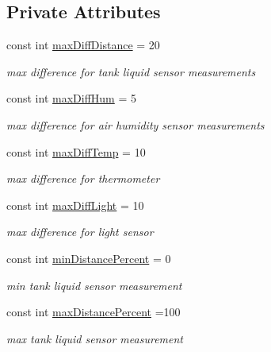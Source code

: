 \subsection*{Private Attributes}
\begin{DoxyCompactItemize}
\item 
\mbox{\label{class_tests_a1f46ebabda9d5d8167e3a4d223457a15}} 
const int \hyperlink{class_tests_a1f46ebabda9d5d8167e3a4d223457a15}{max\+Diff\+Distance} = 20
\begin{DoxyCompactList}\small\item\em max difference for tank liquid sensor measurements \end{DoxyCompactList}\item 
\mbox{\label{class_tests_a07ab513e49457d7d2af195f406cd72c4}} 
const int \hyperlink{class_tests_a07ab513e49457d7d2af195f406cd72c4}{max\+Diff\+Hum} = 5
\begin{DoxyCompactList}\small\item\em max difference for air humidity sensor measurements \end{DoxyCompactList}\item 
\mbox{\label{class_tests_a525378ce61a185d6d07c2afd4b188508}} 
const int \hyperlink{class_tests_a525378ce61a185d6d07c2afd4b188508}{max\+Diff\+Temp} = 10
\begin{DoxyCompactList}\small\item\em max difference for thermometer \end{DoxyCompactList}\item 
\mbox{\label{class_tests_a028492ea95d4af61e0ea356b8fbdb5a0}} 
const int \hyperlink{class_tests_a028492ea95d4af61e0ea356b8fbdb5a0}{max\+Diff\+Light} = 10
\begin{DoxyCompactList}\small\item\em max difference for light sensor \end{DoxyCompactList}\item 
\mbox{\label{class_tests_aeff6ef71e5954e016fc76b9c3d3b6642}} 
const int \hyperlink{class_tests_aeff6ef71e5954e016fc76b9c3d3b6642}{min\+Distance\+Percent} = 0
\begin{DoxyCompactList}\small\item\em min tank liquid sensor measurement \end{DoxyCompactList}\item 
\mbox{\label{class_tests_ac536585d1688cf5d20c0423cce20c588}} 
const int \hyperlink{class_tests_ac536585d1688cf5d20c0423cce20c588}{max\+Distance\+Percent} =100
\begin{DoxyCompactList}\small\item\em max tank liquid sensor measurement \end{DoxyCompactList}\end{DoxyCompactItemize}


